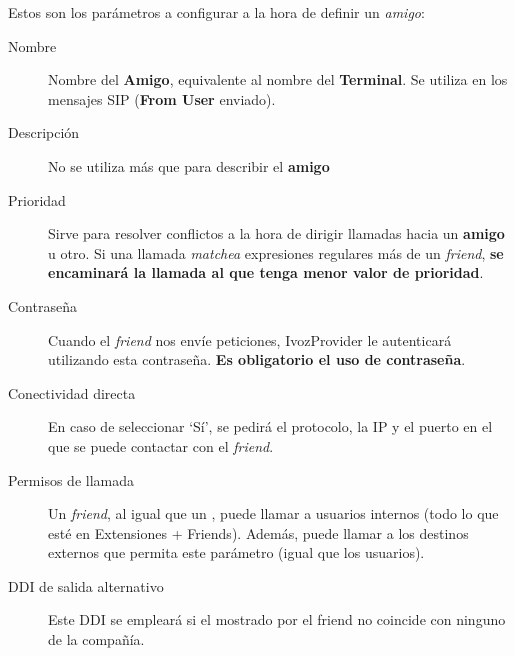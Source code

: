 \documentclass[letterpaper,10pt,spanish]{sphinxmanual}
\begin{document}
Estos son los parámetros a configurar a la hora de definir un \emph{amigo}:
\begin{description}
\item[{Nombre}] \leavevmode{}\label{pbx_features/friends:term-name}
Nombre del \textbf{Amigo}, equivalente al nombre del \textbf{Terminal}. Se utiliza en los mensajes SIP (\textbf{From User} enviado).

\item[{Descripción}] \leavevmode{}\label{pbx_features/friends:term-description}
No se utiliza más que para describir el \textbf{amigo}

\item[{Prioridad}] \leavevmode{}\label{pbx_features/friends:term-priority}
Sirve para resolver conflictos a la hora de dirigir llamadas hacia un \textbf{amigo} u otro. Si una llamada \emph{matchea} expresiones regulares más de un \emph{friend}, \textbf{se encaminará la llamada al que tenga menor valor de prioridad}.

\item[{Contraseña}] \leavevmode{}\label{pbx_features/friends:term-password}
Cuando el \emph{friend} nos envíe peticiones, IvozProvider le autenticará utilizando esta contraseña. \textbf{Es obligatorio el uso de contraseña}.

\item[{Conectividad directa}] \leavevmode{}\label{pbx_features/friends:term-direct-connection}
En caso de seleccionar `Sí', se pedirá el protocolo, la IP y el puerto en el que se puede contactar con el \emph{friend}.

\item[{Permisos de llamada}] \leavevmode{}\label{pbx_features/friends:term-call-acl}
Un \emph{friend}, al igual que un {\hyperref[pbx_features/users:users]{}}, puede llamar a usuarios internos (todo lo que esté en Extensiones + Friends). Además, puede llamar a los destinos externos que permita este parámetro (igual que los usuarios).

\item[{DDI de salida alternativo}] \leavevmode{}\label{pbx_features/friends:term-fallback-outgoing-ddi}
Este DDI se empleará si el mostrado por el friend no coincide con ninguno de la compañía.


\end{description}
\end{document}
